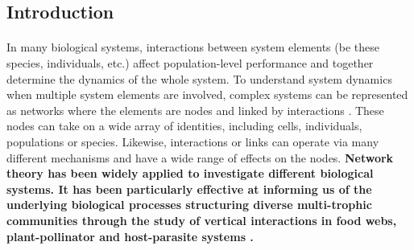 \documentclass[a4,12pt]{article}
\begin{document}
\begin{refsection}

\section{Introduction}

    
    \paragraph{}
    In many biological systems, interactions between system elements (be these species, individuals, etc.) affect population-level performance and together determine the dynamics of the whole system. To understand system dynamics when multiple system elements are involved, complex systems can be represented as networks where the elements are nodes and linked by interactions \parencite{Pimm1978}. These nodes can take on a wide array of identities, including cells, individuals, populations or species. Likewise, interactions or links can operate via many different mechanisms and have a wide range of effects on the nodes. \textbf{Network theory has been widely applied to investigate different biological systems. It has been particularly effective at informing us of the underlying biological processes structuring diverse multi-trophic communities \parencite{Dunne2002, Thompson2012} through the study of vertical interactions in food webs, plant-pollinator and host-parasite systems \parencite{Lafferty2008, Stouffer2014, Cirtwill2015a}.}



\end{refsection}
\end{document}

